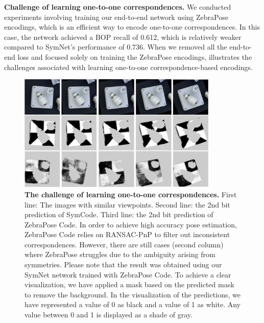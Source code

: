 \textbf{Challenge of learning one-to-one correspondences.} We conducted experiments involving training our end-to-end network using ZebraPose encodings, which is an efficient way to encode one-to-one correspondences. In this case, the network achieved a BOP recall of 0.612, which is relatively weaker compared to SymNet's performance of 0.736. When we removed all the end-to-end loss and focused solely on training the ZebraPose encodings,  illustrates the challenges associated with learning one-to-one correspondence-based encodings.

\begin{figure}[ht]
    \centerline{\includegraphics[width=0.85\textwidth]{figure/symnet/difficulty_learn_one_to_one.jpg}}
    \caption{\textbf{The challenge of learning one-to-one correspondences.} First line: The images with similar viewpoints. Second line: the 2nd bit prediction of SymCode. Third line: the 2nd bit prediction of ZebraPose Code. In order to achieve high accuracy pose estimation, ZebraPose Code relies on RANSAC-PnP to filter out inconsistent correspondences. However, there are still cases (second column) where ZebraPose struggles due to the ambiguity arising from symmetries. Please note that the result was obtained using our SymNet network trained with ZebraPose Code. To achieve a clear visualization, we have applied a mask based on the predicted mask to remove the background. In the visualization of the predictions, we have represented a value of 0 as black and a value of 1 as white. Any value between 0 and 1 is displayed as a shade of gray. }
    \label{fig:difficult_learn_one_to_one}
\end{figure}

